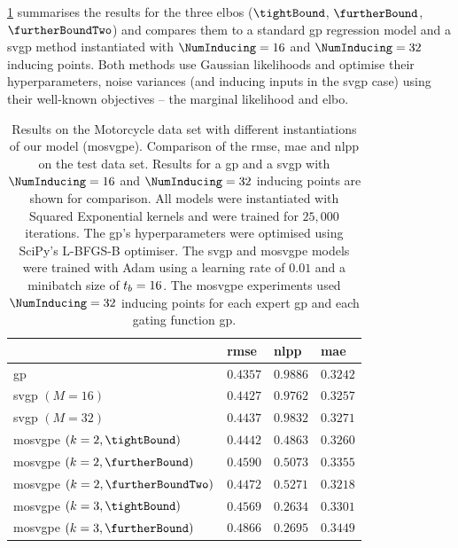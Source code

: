 \documentclass{mimosis-class/mimosis}
\numberwithin{equation}{chapter}
\newcommand{\numData}{\ensuremath{t}}
\newcommand{\NumData}{\ensuremath{\MakeUppercase{\numData}}}
\begin{document}
{\cref{tab-mcycle-metrics} summarises the results for the three \acrshort{elbo}s
(\(\tightBound\), \(\furtherBound\), \(\furtherBoundTwo\))
and compares them to a standard \acrshort{gp} regression model
and a \acrshort{svgp} method instantiated with \(\NumInducing=16\) and \(\NumInducing=32\) inducing points.
Both methods use Gaussian likelihoods and optimise their hyperparameters, noise variances
(and inducing inputs in the \acrshort{svgp} case) using their well-known
objectives -- the marginal likelihood and \acrshort{elbo}.
\begin{table}[htbp]
\caption[\acrshort{mosvgpe} results on motorcycle data set]{\label{tab-mcycle-metrics}Results on the Motorcycle data set \citep{Silverman1985} with different instantiations of our model (\acrshort{mosvgpe}). Comparison of the \acrfull{rmse}, \acrfull{mae} and \acrfull{nlpp} on the test data set. Results for a \acrshort{gp} and a \acrshort{svgp} with \(\NumInducing=16\) and \(\NumInducing=32\) inducing points are shown for comparison. All models were instantiated with Squared Exponential kernels and were trained for \(25,000\) iterations. The \acrshort{gp}'s hyperparameters were optimised using SciPy's \citep{2020SciPy-NMeth} L-BFGS-B optimiser. The \acrshort{svgp} and \acrshort{mosvgpe} models were trained with Adam \citep{kingmaAdam2017} using a learning rate of \(0.01\) and a minibatch size of \(\NumData_b=16\). The \acrshort{mosvgpe} experiments used \(\NumInducing=32\) inducing points for each expert \acrshort{gp} and each gating function \acrshort{gp}.}
\centering
\begin{tabular}{llll}
\hline
 & \acrshort{rmse} & \acrshort{nlpp} & \acrshort{mae}\\
\hline
\acrshort{gp} & \(\mathbf{0.4357}\) & \(0.9886\) & \(0.3242\)\\
\hline
\acrshort{svgp} \((M=16)\) & \(0.4427\) & \(0.9762\) & \(0.3257\)\\
\acrshort{svgp} \((M=32)\) & \(0.4437\) & \(0.9832\) & \(0.3271\)\\
\hline
\acrshort{mosvgpe} \((k=2, \tightBound)\) & \(0.4442\) & \(0.4863\) & \(0.3260\)\\
\acrshort{mosvgpe} \((k=2, \furtherBound)\) & \(0.4590\) & \(0.5073\) & \(0.3355\)\\
\acrshort{mosvgpe} \((k=2, \furtherBoundTwo)\) & \(0.4472\) & \(0.5271\) & \(\mathbf{0.3218}\)\\
\acrshort{mosvgpe} \((k=3, \tightBound)\) & \(0.4569\) & \(\mathbf{0.2634}\) & \(0.3301\)\\
\acrshort{mosvgpe} \((k=3 ,\furtherBound)\) & \(0.4866\) & \(0.2695\) & \(0.3449\)\\

\end{tabular}
\end{table}}
\end{document}
